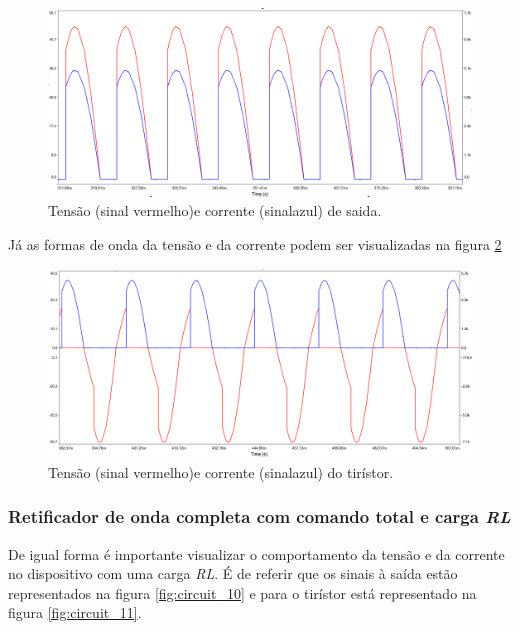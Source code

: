 \documentclass[a4paper,11pt]{article}
\numberwithin{equation}{section}
\begin{document}
\begin{figure}[h]
	\centering
	\includegraphics[keepaspectratio=true, scale=0.4]{img/circuito6}
	\caption{Tensão (sinal vermelho)e corrente (sinalazul) de saida.}
	\label{fig:circuit_8}
	\vspace{-0.8em}
\end{figure}

Já as formas de onda da tensão e da corrente podem ser visualizadas na figura  \ref{fig:circuit_9}

\begin{figure}[h]
	\centering
	\includegraphics[keepaspectratio=true, scale=0.4]{img/circuito7}
	\caption{Tensão (sinal vermelho)e corrente (sinalazul) do tirístor.}
	\label{fig:circuit_9}
	\vspace{-0.8em}
\end{figure}

\vspace{12mm}

\subsubsection{Retificador de onda completa com comando total e carga \textit{RL}}

De igual forma é importante visualizar o comportamento da tensão e da corrente no dispositivo com uma carga \textit{RL}. É de referir que os sinais à saída estão representados na figura \ref{fig:circuit_10} e para o tirístor está representado na figura \ref{fig:circuit_11}.
\pagebreak
\end{document}
